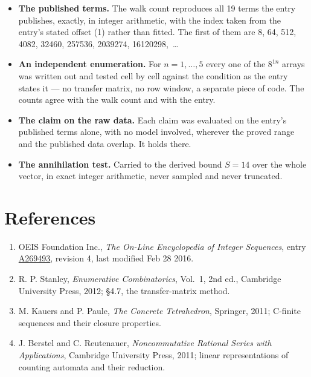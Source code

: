 \documentclass[11pt]{article}
\theoremstyle{definition}
\begin{document}
\begin{itemize}

\item {\bfseries The published terms.} The walk count reproduces all 19 terms the entry publishes, exactly, in integer arithmetic, with the index taken from the entry's stated offset (1) rather than fitted. The first of them are 8, 64, 512, 4082, 32460, 257536, 2039274, 16120298,~\dots

\item {\bfseries An independent enumeration.} For $n = 1,\dots,5$ every one of the $8^{1n}$ arrays was written out and tested cell by cell against the condition as the entry states it --- no transfer matrix, no row window, a separate piece of code. The counts agree with the walk count and with the entry.

\item {\bfseries The claim on the raw data.} Each claim was evaluated on the entry's published terms alone, with no model involved, wherever the proved range and the published data overlap. It holds there.

\item {\bfseries The annihilation test.} Carried to the derived bound $S = 14$ over the whole vector, in exact integer arithmetic, never sampled and never truncated.

\end{itemize}

\section{References}

\begin{enumerate}

\item OEIS Foundation Inc., \emph{The On-Line Encyclopedia of Integer Sequences}, entry \href{https://oeis.org/A269493}{A269493}, revision 4, last modified Feb 28 2016.

\item R. P. Stanley, \emph{Enumerative Combinatorics}, Vol.~1, 2nd ed., Cambridge University Press, 2012; \S4.7, the transfer-matrix method.

\item M. Kauers and P. Paule, \emph{The Concrete Tetrahedron}, Springer, 2011; C-finite sequences and their closure properties.

\item J. Berstel and C. Reutenauer, \emph{Noncommutative Rational Series with Applications}, Cambridge University Press, 2011; linear representations of counting automata and their reduction.

\end{enumerate}
\end{document}
